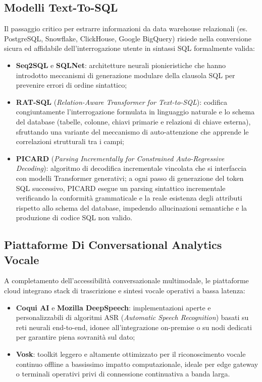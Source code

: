 \documentclass[11pt, a4paper]{article}
\begin{document}
\subsection{Modelli Text-To-SQL}

Il passaggio critico per estrarre informazioni da data warehouse relazionali (es. PostgreSQL, Snowflake, ClickHouse, Google BigQuery) risiede nella conversione sicura ed affidabile dell'interrogazione utente in sintassi SQL formalmente valida:
\begin{itemize}
    \item \textbf{Seq2SQL} e \textbf{SQLNet}: architetture neurali pionieristiche che hanno introdotto meccanismi di generazione modulare della clausola SQL per prevenire errori di ordine sintattico;
    \item \textbf{RAT-SQL} (\emph{Relation-Aware Transformer for Text-to-SQL}): codifica congiuntamente l'interrogazione formulata in linguaggio naturale e lo schema del database (tabelle, colonne, chiavi primarie e relazioni di chiave esterna), sfruttando una variante del meccanismo di auto-attenzione che apprende le correlazioni strutturali tra i campi;
    \item \textbf{PICARD} (\emph{Parsing Incrementally for Constrained Auto-Regressive Decoding}): algoritmo di decodifica incrementale vincolata che si interfaccia con modelli Transformer generativi; a ogni passo di generazione del token SQL successivo, PICARD esegue un parsing sintattico incrementale verificando la conformità grammaticale e la reale esistenza degli attributi rispetto allo schema del database, impedendo allucinazioni semantiche e la produzione di codice SQL non valido.
\end{itemize}

\subsection{Piattaforme Di Conversational Analytics Vocale}

A completamento dell'accessibilità conversazionale multimodale, le piattaforme cloud integrano stack di trascrizione e sintesi vocale operativi a bassa latenza:
\begin{itemize}
    \item \textbf{Coqui AI} e \textbf{Mozilla DeepSpeech}: implementazioni aperte e personalizzabili di algoritmi ASR (\emph{Automatic Speech Recognition}) basati su reti neurali end-to-end, idonee all'integrazione on-premise o su nodi dedicati per garantire piena sovranità sul dato;
    \item \textbf{Vosk}: toolkit leggero e altamente ottimizzato per il riconoscimento vocale continuo offline a bassissimo impatto computazionale, ideale per edge gateway o terminali operativi privi di connessione continuativa a banda larga.
\end{itemize}
\end{document}
